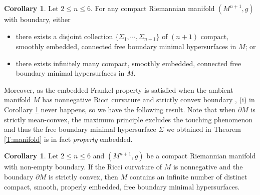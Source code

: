 \documentclass[10pt]{amsart}
\theoremstyle{definition}
\newtheorem{corollary}[theorem]{Corollary}
\theoremstyle{remark}
\numberwithin{equation}{section}
\begin{document}



\begin{corollary}
\label{C:1}
Let $2 \leq n \leq 6$. For any compact Riemannian manifold $(M^{n+1},g)$ with boundary, either
\begin{itemize}
\item[(i)] there exists a disjoint collection $\{\Sigma_1,\cdots,\Sigma_{n+1}\}$ of $(n+1)$ compact, smoothly embedded, connected free boundary minimal hypersurfaces in $M$; or
\item[(ii)] there exists infinitely many compact, smoothly embedded, connected free boundary minimal hypersurfaces in $M$.
\end{itemize}
\end{corollary}

Moreover, as the embedded Frankel property \cite[Definition 1.1]{Marques-Neves17} is satisfied when the ambient manifold $M$ has nonnegative Ricci curvature and strictly convex boundary \cite[Lemma 2.4]{Fraser-Li14}, (i) in Corollary \ref{C:1} never happens, so we have the following result. Note that when $\partial M$ is strictly mean-convex, the maximum principle excludes the touching phenomenon and thus the free boundary minimal hypersurface $\Sigma$ we obtained in Theorem \ref{T:manifold} is in fact \emph{properly} embedded.

\begin{corollary}
\label{C:2}
Let $2 \leq n \leq 6$ and $(M^{n+1},g)$ be a compact Riemannian manifold with non-empty boundary. If the Ricci curvature of $M$ is nonnegative and the boundary $\partial M$ is strictly convex, then $M$ contains an infinite number of distinct compact, smooth, properly embedded, free boundary minimal hypersurfaces.
\end{corollary}
\end{document}
